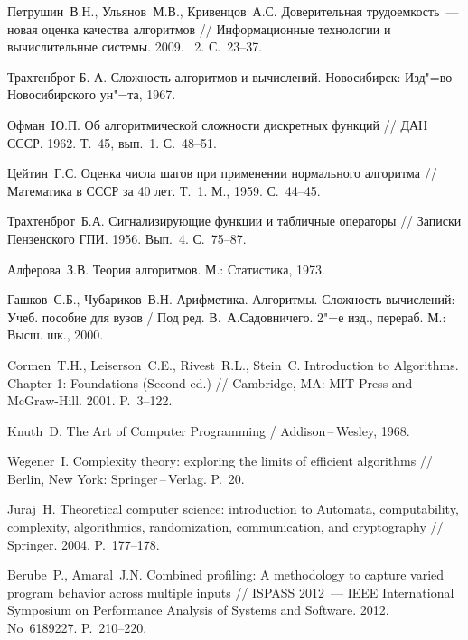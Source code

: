 \documentclass[a4paper, article, 14pt]{extarticle}
\newcommand*{\No}{\textnumero}
\begin{document}
\begin{thebibliography}{1}\label{sec:sources}
	 Петрушин~В.\:Н., Ульянов~М.\:В., Кривенцов~А.\:С. Доверительная трудоемкость~--- новая оценка качества алгоритмов // Информационные технологии и вычислительные системы. 2009. \No~2. С.~23--37.

	 Трахтенброт Б. А. Сложность алгоритмов и вычислений. Новосибирск: Изд"=во Новосибирского ун"=та, 1967.

	 Офман~Ю.\:П. Об алгоритмической сложности дискретных функций // ДАН СССР. 1962. Т.~45, вып.~1. С.~48--51.

	 Цейтин~Г.\:С. Оценка числа шагов при применении нормального алгоритма // Математика в СССР за 40 лет. Т.~1. М., 1959. С.~44--45.

	 Трахтенброт~Б.\:А. Сигнализирующие функции и табличные операторы // Записки Пензенского ГПИ. 1956. Вып.~4. С.~75--87.
	
	 Алферова~З.\:В. Теория алгоритмов. М.: Статистика, 1973.

	 Гашков~С.\:Б., Чубариков~В.\:Н. Арифметика. Алгоритмы. Сложность вычислений: Учеб. пособие для вузов / Под ред. В.~А.\:Садовничего. 2"=е изд., перераб. М.: Высш. шк., 2000.

	 Cormen~T.\:H., Leiserson~C.\:E., Rivest~R.\:L., Stein~C. Introduction to Algorithms. Chapter 1: Foundations (Second ed.) // Cambridge, MA: MIT Press and McGraw-Hill. 2001. P.~3--122.

	 Knuth~D. The Art of Computer Programming / Addison\,--\,Wesley, 1968.

	 Wegener~I. Complexity theory: exploring the limits of efficient algorithms // Berlin, New York: Springer\,--\,Verlag. P.~20.

	 Juraj~H. Theoretical computer science: introduction to Automata, computability, complexity, algorithmics, randomization, communication, and cryptography // Springer. 2004. P.~177--178.

	 Berube~P., Amaral~J.\:N. Combined profiling: A methodology to capture varied program behavior across multiple inputs // ISPASS 2012~--- IEEE International Symposium on Performance Analysis of Systems and Software. 2012. No~6189227. P.~210--220.


\end{thebibliography}
\end{document}
